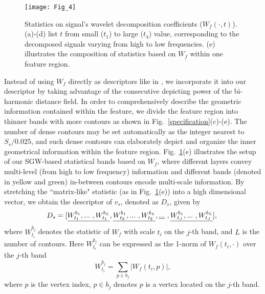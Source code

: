 \begin{figure}[!to]
\begin{center}
\texttt{[image: Fig\_4]}
\end{center}
\caption[Statistics on wavelet decomposition coefficients.]
  {Statistics on signal's wavelet decomposition coefficients
  ($W_f(\cdot,t)$). (a)-(d) list $t$ from small ($t_1$) to large
  ($t_4$) value, corresponding to the decomposed signals varying from
  high to low frequencies. (e) illustrates the composition of
  statistics based on $W_f$ within one feature region.}
\label{wmd}
\end{figure}

Instead of using $W_f$ directly as descriptors like in \cite{Li:2013}, 
we incorporate it into our descriptor by taking advantage of the
consecutive depicting power of the bi-harmonic distance field. In
order to comprehensively describe the geometric information contained
within the feature, we divide the feature region into thinner bands
with more contours as shown in Fig.~\ref{specification}(c)-(e). 
The number of dense contours may be set automatically as the integer nearest 
to $S_{s}/0.025$, and such dense contours can elaborately depict and 
organize the inner geometrical information within the feature
region. Fig.~\ref{wmd}(e) illustrates the setup of our SGW-based statistical
bands based on $W_f$, where different layers convey multi-level (from
high to low frequency) information and different bands (denoted in
yellow and green) in-between contours encode multi-scale information.
By stretching the ``matrix-like" statistic (as in Fig.~\ref{wmd}(e))
into a high dimensional vector, we obtain the descriptor of $v_s$,
denoted as $D_s$, given by
\begin{equation}
\label{eq:Des}
\hspace{-1.2mm}
D_s=[\underline{W_{t_1}^{b_1},...\ ,W_{t_1}^{b_L}},\\
\underline{W_{t_2}^{b_1},...\ ,W_{t_2}^{b_L}},\\
\underline{...}\ , \\
\underline{W_{t_J}^{b_1},...\ ,W_{t_J}^{b_L}}],
\end{equation}
where $W_{t_i}^{b_j}$ denotes the statistic of $W_f$ with scale $t_i$
on the $j$-th band, and $L$ is the number of contours. Here
$W_{t_i}^{b_j}$ can be expressed as the 1-norm of $W_f(t_i, \cdot)$
over the $j$-th band
\begin{equation}
\label{eq:WMD_sta}
W_{t_i}^{b_j} = \sum_{p \in b_j}| W_f(t_i,p)|,
\end{equation}
where $p$ is the vertex index, $p \in b_j$ denotes $p$ is a vertex
located on the $j$-th band.

